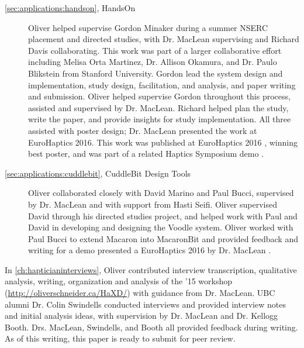 \begin{description}
\item[\autoref{sec:applications:handson}, HandsOn] Oliver helped supervise Gordon Minaker during a summer NSERC placement and directed studies, with Dr. MacLean supervising and Richard Davis collaborating.
This work was part of a larger collaborative effort including Melisa Orta Martinez, Dr. Allison Okamura, and Dr. Paulo Blikstein from Stanford University.
Gordon lead the system design and implementation, study design, facilitation, and analysis, and paper writing and submission.
Oliver helped supervise Gordon throughout this process, assisted and supervised by Dr. MacLean.
Richard helped plan the study, write the paper, and provide insights for study implementation.
All three assisted with poster design; Dr. MacLean presented the work at EuroHaptics 2016.
This work was published at EuroHaptics 2016 \cite{Minaker2016}, winning best poster, and was part of a related Haptics Symposium demo \cite{Martinez-demo-hapkit2016}.

\item[\autoref{sec:applications:cuddlebit}, CuddleBit Design Tools] Oliver collaborated closely with David Marino and Paul Bucci, supervised by Dr. MacLean and with support from Hasti Seifi.
Oliver supervised David through his directed studies project, and helped work with Paul and David in developing and designing the Voodle system.
Oliver worked with Paul Bucci to extend Macaron into MacaronBit and provided feedback and writing for a demo presented a EuroHaptics 2016 by Dr. MacLean \cite{Bucci2016}.

\end{description}


In \autoref{ch:hapticianinterviews}, Oliver contributed interview transcription, qualitative analysis, writing, organization and analysis of the \haxd '15 workshop (\url{http://oliverschneider.ca/HaXD/}) with guidance from Dr. MacLean.
UBC alumni Dr. Colin Swindells conducted interviews and provided interview notes and initial analysis ideas, with supervision  by Dr. MacLean and Dr. Kellogg Booth.
Drs. MacLean, Swindells, and Booth all provided feedback during writing.
As of this writing, this paper is ready to submit for peer review.








